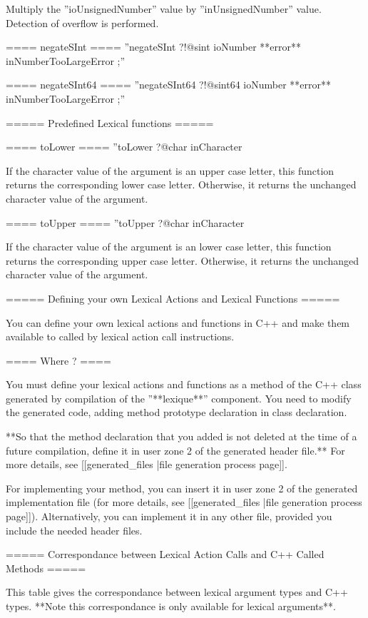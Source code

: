 {Multiply the ''ioUnsignedNumber'' value by ''inUnsignedNumber'' value. Detection of overflow is performed.

==== negateSInt ====
''negateSInt ?!@sint ioNumber **error** inNumberTooLargeError ;''

==== negateSInt64 ====
''negateSInt64 ?!@sint64 ioNumber **error** inNumberTooLargeError ;''

===== Predefined Lexical functions =====

==== toLower ====
''toLower ?@char inCharacter %

If the character value of the argument is an upper case letter, this function returns the corresponding lower case letter. Otherwise, it returns the unchanged character value of the argument.

==== toUpper ====
''toUpper ?@char inCharacter %


If the character value of the argument is an lower case letter, this function returns the corresponding upper case letter. Otherwise, it returns the unchanged character value of the argument.



===== Defining your own Lexical Actions and Lexical Functions =====

You can define your own lexical actions and functions in C++ and make them available to called by lexical action call instructions.

==== Where ? ====

You must define your lexical actions and functions as a method of the C++ class generated by compilation of the ''**lexique**'' component. You need to modify the generated code, adding method prototype declaration in class declaration.

**So that the method declaration that you added is not deleted at the time of a future compilation, define it in user zone 2 of the generated header file.** For more details, see [[generated\_files |file generation process page]].

For implementing your method, you can insert it in user zone 2 of the generated implementation file (for more details, see [[generated\_files |file generation process page]]). Alternatively, you can implement it in any other file, provided you include the needed header files.

===== Correspondance between Lexical Action Calls and C++ Called Methods =====

This table gives the correspondance between lexical argument types and C++ types. **Note this correspondance is only available for lexical arguments**.

}
